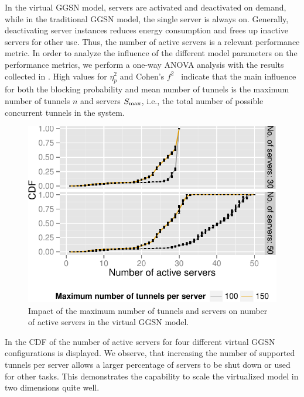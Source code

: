In the virtual \gls{GGSN} model, servers are activated and deactivated on demand, while in the traditional \gls{GGSN} model, the single server is always on.
Generally, deactivating server instances reduces energy consumption and frees up inactive servers for other use.
Thus, the number of active servers is a relevant performance metric.
In order to analyze the influence of the different model parameters on the performance metrics, we perform a one-way ANOVA analysis with the results collected in .
High values for $\eta_p^2$ and Cohen's $f^2$~\cite{stats} indicate that the main influence for both the blocking probability and mean number of tunnels is the maximum number of tunnels $n$ and servers $S_{\max}$, i.e., the total number of possible concurrent tunnels in the system.
\begin{figure}[htbp]
  \begin{center}
  \includegraphics[width=1.0\columnwidth]{figures/instanceuse-multiserver-real.pdf}
  \caption{Impact of the maximum number of tunnels and servers on number of active servers in the virtual \gls{GGSN} model.}
\label{fig:instance_use_virtual}
  \end{center}
\end{figure}
In  the \gls{CDF} of the number of active servers for four different virtual \gls{GGSN} configurations is displayed.
We observe, that increasing the number of supported tunnels per server allows a larger percentage of servers to be shut down or used for other tasks. This demonstrates the capability to scale the virtualized model in two dimensions quite well.
